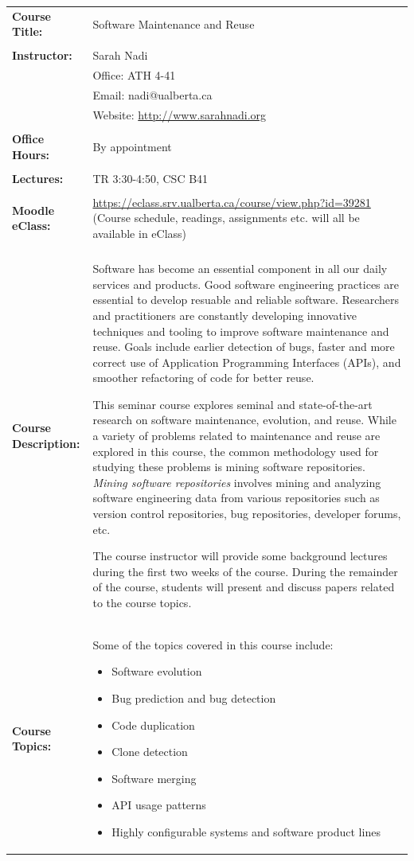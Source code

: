 \documentclass[12pt]{article}
\newcommand{\newsec}[1]{\\ \textbf{#1:}}
\begin{document}
\begin{longtable}{p{}p{}}

\newsec{Course Title} &Software Maintenance and Reuse\\

\newsec{Instructor}&Sarah Nadi\\
&Office: ATH 4-41\\
&Email: nadi@ualberta.ca\\
&Website: \url{http://www.sarahnadi.org}\\

\newsec{Office Hours}&By appointment\\

\newsec{Lectures}&TR 3:30-4:50, CSC B41\\

\newsec{Moodle eClass}&\url{https://eclass.srv.ualberta.ca/course/view.php?id=39281} (Course schedule, readings, assignments etc. will all be available in eClass)\\

\newsec{Course Description}&Software has become an essential component in all our daily services and products. Good software engineering practices are essential to develop resuable and reliable software. Researchers and practitioners are constantly developing innovative techniques and tooling to improve software maintenance and reuse. Goals include earlier detection of bugs, faster and more correct use of Application Programming Interfaces (APIs), and smoother refactoring of code for better reuse. 

This seminar course explores seminal and state-of-the-art research on software maintenance, evolution, and reuse. While a variety of problems related to maintenance and reuse are explored in this course, the common methodology used for studying these problems is mining software repositories. \textit{Mining software repositories} involves mining and analyzing software engineering data from various repositories such as version control repositories, bug repositories, developer forums, etc. 

The course instructor will provide some background lectures during the first two weeks of the course. During the remainder of the course, students will present and discuss papers related to the course topics.

\newsec{Course Topics} & Some of the topics covered in this course include:
\begin{itemize}
\item Software evolution
\item Bug prediction and bug detection
\item Code duplication
\item Clone detection
\item Software merging
\item API usage patterns
\item Highly configurable systems and software product lines
\end{itemize}
\\


\end{longtable}
\end{document}
